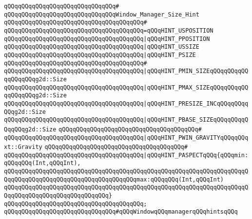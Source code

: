 \verb|qQQqqQQqqQQqqQQqqQQqqQQqqQQqqQQq#|\newline
\verb|qQQqqQQqqQQqqQQqqQQqqQQqqQQqqQQqWindow_Manager_Size_Hint|\newline
\verb|qQQqqQQqqQQqqQQqqQQqqQQqqQQqqQQqqQQqqQQq#|\newline
\verb|qQQqqQQqqQQqqQQqqQQqqQQqqQQqqQQqqQQqqQQq=qQQqHINT_USPOSITION|\newline
\verb|qQQqqQQqqQQqqQQqqQQqqQQqqQQqqQQqqQQqqQQq|\verb#|qQQqHINT_PPOSITION#\newline
\verb|qQQqqQQqqQQqqQQqqQQqqQQqqQQqqQQqqQQqqQQq|\verb#|qQQqHINT_USSIZE#\newline
\verb|qQQqqQQqqQQqqQQqqQQqqQQqqQQqqQQqqQQqqQQq|\verb#|qQQqHINT_PSIZE#\newline
\verb|qQQqqQQqqQQqqQQqqQQqqQQqqQQqqQQqqQQqqQQq#|\newline
\verb|qQQqqQQqqQQqqQQqqQQqqQQqqQQqqQQqqQQqqQQq|\verb#|qQQqHINT_PMIN_SIZEqQQqqQQqqQQqqQQqqQQqg2d::Size#\newline
\verb|qQQqqQQqqQQqqQQqqQQqqQQqqQQqqQQqqQQqqQQq|\verb#|qQQqHINT_PMAX_SIZEqQQqqQQqqQQqqQQqqQQqg2d::Size#\newline
\verb|qQQqqQQqqQQqqQQqqQQqqQQqqQQqqQQqqQQqqQQq|\verb#|qQQqHINT_PRESIZE_INCqQQqqQQqqQQqg2d::Size#\newline
\verb|qQQqqQQqqQQqqQQqqQQqqQQqqQQqqQQqqQQqqQQq|\verb#|qQQqHINT_PBASE_SIZEqQQqqQQqqQQqqQQqg2d::Size#\newline
\verb|qQQqqQQqqQQqqQQqqQQqqQQqqQQqqQQqqQQqqQQq#|\newline
\verb|qQQqqQQqqQQqqQQqqQQqqQQqqQQqqQQqqQQqqQQq|\verb#|qQQqHINT_PWIN_GRAVITYqQQqqQQqxt::Gravity#\newline
\verb|qQQqqQQqqQQqqQQqqQQqqQQqqQQqqQQqqQQqqQQq#|\newline
\verb|qQQqqQQqqQQqqQQqqQQqqQQqqQQqqQQqqQQqqQQq|\verb#|qQQqHINT_PASPECTqQQq{qQQqmin:qQQqqQQq(Int,qQQqInt),#\newline
\verb|qQQqqQQqqQQqqQQqqQQqqQQqqQQqqQQqqQQqqQQqqQQqqQQqqQQqqQQqqQQqqQQqqQQqqQQqqQQqqQQqqQQqqQQqqQQqqQQqqQQqqQQqqQQqmax:qQQqqQQq(Int,qQQqInt)|\newline
\verb|qQQqqQQqqQQqqQQqqQQqqQQqqQQqqQQqqQQqqQQqqQQqqQQqqQQqqQQqqQQqqQQqqQQqqQQqqQQqqQQqqQQqqQQqqQQqqQQqqQQq}|\newline
\verb|qQQqqQQqqQQqqQQqqQQqqQQqqQQqqQQqqQQqqQQq;|\newline
\newline
\newline
\verb|qQQqqQQqqQQqqQQqqQQqqQQqqQQqqQQq#qQQqWindowqQQqmanagerqQQqhintsqQQq|\newline
